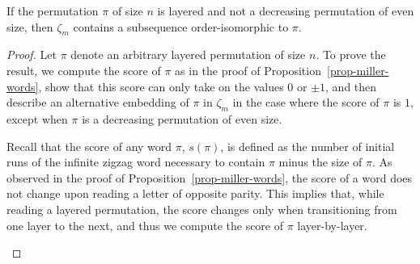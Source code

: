 \begin{proposition}
	\label{prop-layered-zeta}
	If the permutation $\pi$ of size $n$ is layered and not a decreasing permutation of even size, then $\zeta_m$ contains a subsequence order-isomorphic to $\pi$.
\end{proposition}
\begin{proof}
	Let $\pi$ denote an arbitrary layered permutation of size $n$. To prove the result, we compute the score of $\pi$ as in the proof of Proposition~\ref{prop-miller-words}, show that this score can only take on the values $0$ or $\pm 1$, and then describe an alternative embedding of $\pi$ in $\zeta_m$ in the case where the score of $\pi$ is $1$, except when $\pi$ is a decreasing permutation of even size.

	Recall that the score of any word $\pi$, $s(\pi)$, is defined as the number of initial runs of the infinite zigzag word necessary to contain $\pi$ minus the size of $\pi$. As observed in the proof of Proposition~\ref{prop-miller-words}, the score of a word does not change upon reading a letter of opposite parity. This implies that, while reading a layered permutation, the score changes only when transitioning from one layer to the next, and thus we compute the score of $\pi$ layer-by-layer.

	\renewcommand{\OE}{\textsf{odd}\text{--}\textsf{even}}
	\newcommand{\OO}{\textsf{odd}\text{--}\textsf{odd}}
	\newcommand{\EE}{\textsf{even}\text{--}\textsf{even}}
	\newcommand{\EO}{\textsf{even}\text{--}\textsf{odd}}

	\begin{figure}[ht]
	\captionsetup{justification=centering}
		\begin{footnotesize}
\end{footnotesize}
\end{figure}
\end{proof}
